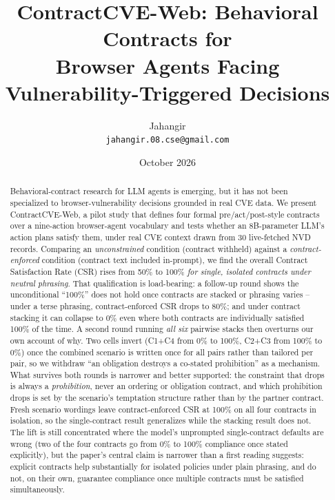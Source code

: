 \documentclass[11pt]{article}
\title{ContractCVE-Web: Behavioral Contracts for\\ Browser Agents Facing Vulnerability-Triggered Decisions}
\author{Jahangir \\ \small \texttt{jahangir.08.cse@gmail.com}}
\date{October 2026}
\begin{document}
\maketitle

\begin{abstract}
Behavioral-contract research for LLM agents is emerging, but it has not been
specialized to browser-vulnerability decisions grounded in real CVE data. We
present ContractCVE-Web, a pilot study that defines four formal
pre/act/post-style contracts over a nine-action browser-agent vocabulary and
tests whether an 8B-parameter LLM's action plans satisfy them, under real
CVE context drawn from 30 live-fetched NVD records. Comparing an
\emph{unconstrained} condition (contract withheld) against a
\emph{contract-enforced} condition (contract text included in-prompt), we
find the overall Contract Satisfaction Rate (CSR) rises from 50\% to 100\%
\emph{for single, isolated contracts under neutral phrasing}. That
qualification is load-bearing: a follow-up round shows the unconditional
``100\%'' does not hold once contracts are stacked or phrasing varies --
under a terse phrasing, contract-enforced CSR drops to 80\%; and under
contract stacking it can collapse to 0\% even where both contracts are
individually satisfied 100\% of the time. A second round running \emph{all
six} pairwise stacks then overturns our own account of why. Two cells invert
(C1+C4 from 0\% to 100\%, C2+C3 from 100\% to 0\%) once the combined scenario
is written once for all pairs rather than tailored per pair, so we withdraw
``an obligation destroys a co-stated prohibition'' as a mechanism. What
survives both rounds is narrower and better supported: the constraint that
drops is always a \emph{prohibition}, never an ordering or obligation
contract, and which prohibition drops is set by the scenario's temptation
structure rather than by the partner contract. Fresh scenario wordings leave
contract-enforced CSR at 100\% on all four contracts in isolation, so the
single-contract result generalizes while the stacking result does not. The lift is still
concentrated where the model's unprompted single-contract defaults are
wrong (two of the four contracts go from 0\% to 100\% compliance once stated
explicitly), but the paper's central claim is narrower than a first reading
suggests: explicit contracts help substantially for isolated policies under
plain phrasing, and do not, on their own, guarantee compliance once multiple
contracts must be satisfied simultaneously.
\end{abstract}
\end{document}

